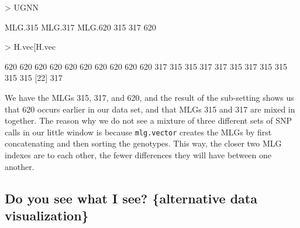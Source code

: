 \documentclass[letterpaper]{article}
\begin{document}
\begin{Schunk}
\begin{Sinput}
> UGNN
\end{Sinput}
\begin{Soutput}
MLG.315 MLG.317 MLG.620 
    315     317     620 
\end{Soutput}
\begin{Sinput}
> H.vec[H.vec %
\end{Sinput}
\begin{Soutput}
 [1] 620 620 620 620 620 620 620 620 620 620 317 315 315 317 317 315 317 315 315 315 315
[22] 317
\end{Soutput}
\end{Schunk}

We have the MLGs 315, 317, and 620, and the result of the sub-setting shows us that 620 occurs earlier in our data set, and that MLGs 315 and 317 are mixed in together. The reason why we do not see a mixture of three different sets of SNP calls in our little window is because \texttt{mlg.vector} creates the MLGs by first concatenating and then sorting the genotypes. This way, the closer two MLG indexes are to each other, the fewer differences they will have between one another. 
\subsection{Do you see what I see? \{alternative data visualization\}}
\end{document}
